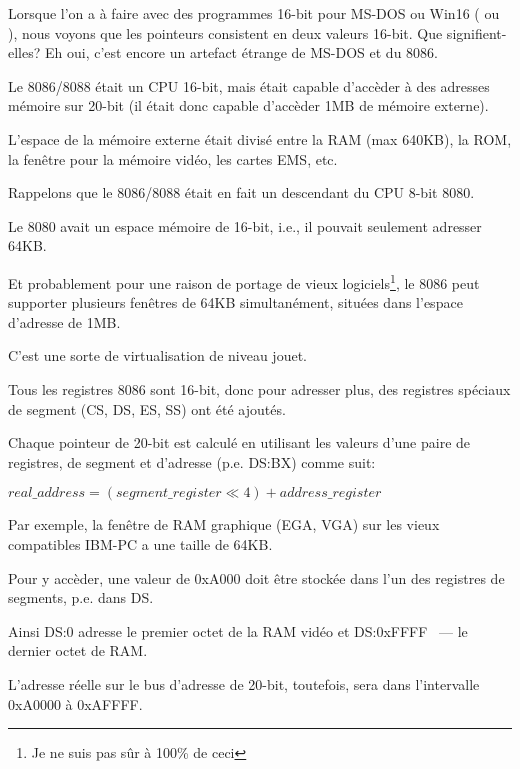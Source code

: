 \label{8086_memory_model}

Lorsque l'on a à faire avec des programmes 16-bit pour MS-DOS ou Win16
( ou ),
nous voyons que les pointeurs consistent en deux valeurs 16-bit.
Que signifient-elles? Eh oui, c'est encore un artefact étrange de MS-DOS et du 8086.

Le 8086/8088 était un CPU 16-bit, mais était capable d'accèder à des adresses mémoire
sur 20-bit (il était donc capable d'accèder 1MB de mémoire externe).

L'espace de la mémoire externe était divisé entre la \ac{RAM} (max 640KB), la \ac{ROM},
la fenêtre pour la mémoire vidéo, les cartes EMS, etc.

Rappelons que le 8086/8088 était en fait un descendant du CPU 8-bit 8080.

Le 8080 avait un espace mémoire de 16-bit, i.e., il pouvait seulement adresser 64KB.

Et probablement pour une raison de portage de vieux logiciels\footnote{Je ne suis
pas sûr à 100\% de ceci}, le 8086 peut supporter plusieurs fenêtres de 64KB simultanément,
situées dans l'espace d'adresse de 1MB.

C'est une sorte de virtualisation de niveau jouet.

Tous les registres 8086 sont 16-bit, donc pour adresser plus, des registres spéciaux
de segment (CS, DS, ES, SS) ont été ajoutés.

Chaque pointeur de 20-bit est calculé en utilisant les valeurs d'une paire de registres,
de segment et d'adresse (p.e. DS:BX) comme suit:

\begin{center}
$real\_address = (segment\_register \ll 4) + address\_register$
\end{center}

Par exemple, la fenêtre de \ac{RAM} graphique (\ac{EGA}, \ac{VGA}) sur les vieux
compatibles IBM-PC a une taille de 64KB.

Pour y accèder, une valeur de 0xA000 doit être stockée dans l'un des registres de
segments, p.e. dans DS.

Ainsi DS:0 adresse le premier octet de la \ac{RAM} vidéo et DS:0xFFFF ~--- le dernier
octet de RAM.

L'adresse réelle sur le bus d'adresse de 20-bit, toutefois, sera dans l'intervalle
0xA0000 à 0xAFFFF.

